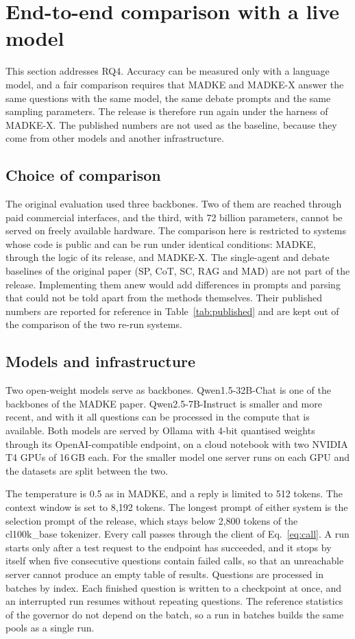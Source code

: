 \section{End-to-end comparison with a live model}
\label{sec:live}

This section addresses RQ4. Accuracy can be measured only with a language model, and a fair comparison requires that MADKE and MADKE-X answer the same questions with the same model, the same debate prompts and the same sampling parameters. The release is therefore run again under the harness of MADKE-X. The published numbers are not used as the baseline, because they come from other models and another infrastructure.

\subsection{Choice of comparison}
The original evaluation used three backbones. Two of them are reached through paid commercial interfaces, and the third, with 72 billion parameters, cannot be served on freely available hardware. The comparison here is restricted to systems whose code is public and can be run under identical conditions: MADKE, through the logic of its release, and MADKE-X. The single-agent and debate baselines of the original paper (SP, CoT, SC, RAG and MAD) are not part of the release. Implementing them anew would add differences in prompts and parsing that could not be told apart from the methods themselves. Their published numbers are reported for reference in Table~\ref{tab:published} and are kept out of the comparison of the two re-run systems.

\subsection{Models and infrastructure}
Two open-weight models serve as backbones. Qwen1.5-32B-Chat \cite{bai2023qwen} is one of the backbones of the MADKE paper. Qwen2.5-7B-Instruct \cite{yang2024qwen25} is smaller and more recent, and with it all questions can be processed in the compute that is available. Both models are served by Ollama with 4-bit quantised weights through its OpenAI-compatible endpoint, on a cloud notebook with two NVIDIA T4 GPUs of 16\,GB each. For the smaller model one server runs on each GPU and the datasets are split between the two.

The temperature is 0.5 as in MADKE, and a reply is limited to 512 tokens. The context window is set to 8,192 tokens. The longest prompt of either system is the selection prompt of the release, which stays below 2,800 tokens of the cl100k\_base tokenizer. Every call passes through the client of Eq.~\eqref{eq:call}. A run starts only after a test request to the endpoint has succeeded, and it stops by itself when five consecutive questions contain failed calls, so that an unreachable server cannot produce an empty table of results. Questions are processed in batches by index. Each finished question is written to a checkpoint at once, and an interrupted run resumes without repeating questions. The reference statistics of the governor do not depend on the batch, so a run in batches builds the same pools as a single run.

